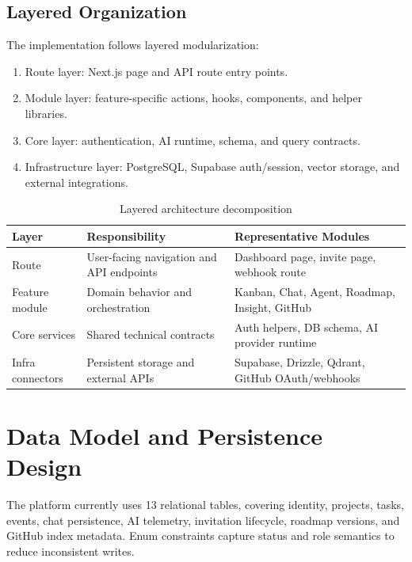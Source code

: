 \documentclass[a4paper, 11pt, oneside]{Dissertation}
\begin{document}
\subsection{Layered Organization}
The implementation follows layered modularization:

\begin{enumerate}
\item Route layer: Next.js page and API route entry points.
\item Module layer: feature-specific actions, hooks, components, and helper libraries.
\item Core layer: authentication, AI runtime, schema, and query contracts.
\item Infrastructure layer: PostgreSQL, Supabase auth/session, vector storage, and external integrations.
\end{enumerate}

\begin{table}[H]
\centering
\begin{tabular}{|L{3.1cm}|L{5.0cm}|L{3.4cm}|}
\hline
\textbf{Layer} & \textbf{Responsibility} & \textbf{Representative Modules} \\
\hline
Route & User-facing navigation and API endpoints & Dashboard page, invite page, webhook route \\
\hline
Feature module & Domain behavior and orchestration & Kanban, Chat, Agent, Roadmap, Insight, GitHub \\
\hline
Core services & Shared technical contracts & Auth helpers, DB schema, AI provider runtime \\
\hline
Infra connectors & Persistent storage and external APIs & Supabase, Drizzle, Qdrant, GitHub OAuth/webhooks \\
\hline
\end{tabular}
\caption{Layered architecture decomposition}
\label{tab:layered-architecture}
\end{table}

\FloatBarrier

\section{Data Model and Persistence Design}
The platform currently uses 13 relational tables, covering identity, projects, tasks, events, chat persistence, AI telemetry, invitation lifecycle, roadmap versions, and GitHub index metadata. Enum constraints capture status and role semantics to reduce inconsistent writes.
\end{document}
